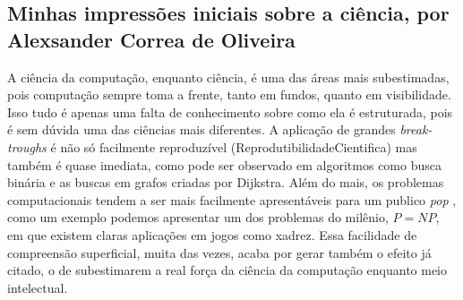 \subsection{Minhas impressões iniciais sobre a ciência, por Alexsander Correa de Oliveira}

A ciência da computação, enquanto ciência, é uma das áreas mais subestimadas, pois computação sempre toma a frente, tanto em fundos, quanto em visibilidade. Isso tudo é apenas uma falta de conhecimento sobre como ela é estruturada, pois é sem dúvida uma das ciências mais diferentes. A aplicação de grandes \emph{break-troughs} é não só facilmente reproduzível (\gls{ReprodutibilidadeCientifica}) mas também é quase imediata, como pode ser observado em algoritmos como busca binária e as buscas em grafos criadas por Dijkstra. 
Além do mais, os problemas computacionais tendem a ser mais facilmente apresentáveis para um publico \emph{pop} \citep{wikipedia_scientific_2021}, como um exemplo podemos apresentar um dos problemas do milênio, $P = NP$, em que existem claras aplicações em jogos como xadrez. Essa facilidade de compreensão superficial, muita das vezes, acaba por gerar também o efeito já citado, o de subestimarem a real força da ciência da computação enquanto meio intelectual. 
